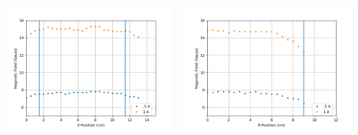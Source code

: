 \documentclass[
30pt,%
a1paper, 
landscape,%
margin = 0mm,
innermargin = -2cm,
colspace = 5mm,
subcolspace = 0mm,
blockverticalspace=.5cm %
]{tikzposter}
\begin{document}
\begin{columns}
{	
	\begin{minipage}{.15\textwidth}
		\begin{tikzfigure}[]
			\includegraphics[width=1\textwidth]{../Helmholtz/FieldAxial.png}
		\end{tikzfigure}
	\end{minipage}
	\begin{minipage}{.15\textwidth}
		\begin{tikzfigure}[]
			\includegraphics[width=1\textwidth]{../Helmholtz/FieldRadial.png}
		\end{tikzfigure}
		
	\end{minipage}
	
}


\end{columns}
\end{document}
